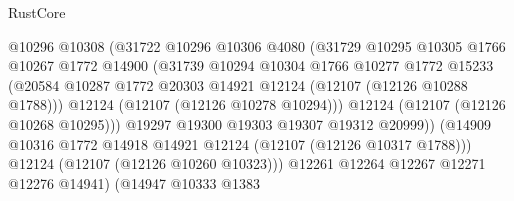 \begin{lexlean}{RustCore}
\begin{coremodule}
                                    @10296
                                    @10308
                                    (@31722
                                      @10296
                                      @10306
                                      @4080
                                      (@31729
                                        @10295
                                        @10305
                                        @1766
                                        @10267
                                        @1772
                                        @14900
                                        (@31739
                                          @10294
                                          @10304
                                          @1766
                                          @10277
                                          @1772
                                          @15233
                                          (@20584
                                            @10287
                                            @1772
                                            @20303
                                            @14921
                                            @12124
                                            (@12107 (@12126 @10288 @1788)))
                                          @12124
                                          (@12107 (@12126 @10278 @10294)))
                                        @12124
                                        (@12107 (@12126 @10268 @10295)))
                                      @19297
                                      @19300
                                      @19303
                                      @19307
                                      @19312
                                      @20999))
                                  (@14909
                                    @10316
                                    @1772
                                    @14918
                                    @14921
                                    @12124
                                    (@12107 (@12126 @10317 @1788)))
                                  @12124
                                  (@12107 (@12126 @10260 @10323)))
                                @12261
                                @12264
                                @12267
                                @12271
                                @12276
                                @14941)
                              (@14947
                                @10333
                                @1383

\end{coremodule}
\end{lexlean}
